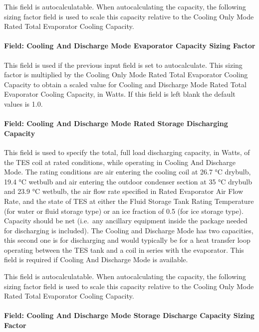 This field is autocalculatable. When autocalculating the capacity, the following sizing factor field is used to scale this capacity relative to the Cooling Only Mode Rated Total Evaporator Cooling Capacity.

\paragraph{Field: Cooling And Discharge Mode Evaporator Capacity Sizing Factor}\label{field-cooling-and-discharge-mode-evaporator-capacity-sizing-factor}

This field is used if the previous input field is set to autocalculate. This sizing factor is multiplied by the Cooling Only Mode Rated Total Evaporator Cooling Capacity to obtain a scaled value for Cooling and Discharge Mode Rated Total Evaporator Cooling Capacity, in Watts. If this field is left blank the default values is 1.0.

\paragraph{Field: Cooling And Discharge Mode Rated Storage Discharging Capacity}\label{field-cooling-and-discharge-mode-rated-storage-discharging-capacity}

This field is used to specify the total, full load discharging capacity, in Watts, of the TES coil at rated conditions, while operating in Cooling And Discharge Mode. The rating conditions are air entering the cooling coil at 26.7 °C drybulb, 19.4 °C wetbulb and air entering the outdoor condenser section at 35 °C drybulb and 23.9 °C wetbulb, the air flow rate specified in Rated Evaporator Air Flow Rate, and the state of TES at either the Fluid Storage Tank Rating Temperature (for water or fluid storage type) or an ice fraction of 0.5 (for ice storage type). Capacity should be net (i.e.~any ancillary equipment inside the package needed for discharging is included). The Cooling and Discharge Mode has two capacities, this second one is for discharging and would typically be for a heat transfer loop operating between the TES tank and a coil in series with the evaporator. This field is required if Cooling And Discharge Mode is available.

This field is autocalculatable. When autocalculating the capacity, the following sizing factor field is used to scale this capacity relative to the Cooling Only Mode Rated Total Evaporator Cooling Capacity.

\paragraph{Field: Cooling And Discharge Mode Storage Discharge Capacity Sizing Factor}\label{field-cooling-and-discharge-mode-storage-discharge-capacity-sizing-factor}

